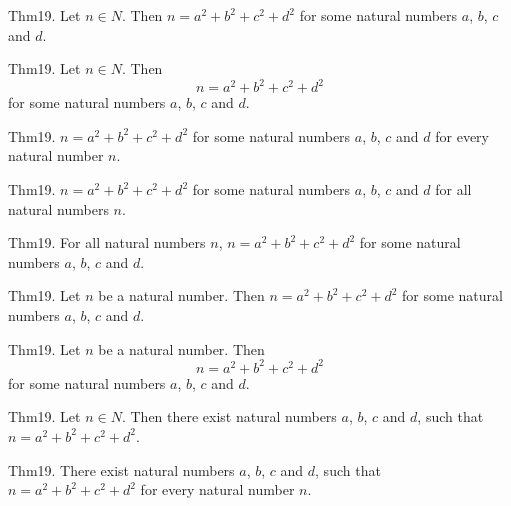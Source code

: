 \documentclass{article}
\begin{document}
Thm19. Let $n \in N$. Then $n = a ^{ 2}+ b ^{ 2}+ c ^{ 2}+ d ^{ 2}$ for some natural numbers $a$, $b$, $c$ and $d$.

Thm19. Let $n \in N$. Then $$n = a ^{ 2}+ b ^{ 2}+ c ^{ 2}+ d ^{ 2}$$ for some natural numbers $a$, $b$, $c$ and $d$.

Thm19. $n = a ^{ 2}+ b ^{ 2}+ c ^{ 2}+ d ^{ 2}$ for some natural numbers $a$, $b$, $c$ and $d$ for every natural number $n$.

Thm19. $n = a ^{ 2}+ b ^{ 2}+ c ^{ 2}+ d ^{ 2}$ for some natural numbers $a$, $b$, $c$ and $d$ for all natural numbers $n$.

Thm19. For all natural numbers $n$, $n = a ^{ 2}+ b ^{ 2}+ c ^{ 2}+ d ^{ 2}$ for some natural numbers $a$, $b$, $c$ and $d$.

Thm19. Let $n$ be a natural number. Then $n = a ^{ 2}+ b ^{ 2}+ c ^{ 2}+ d ^{ 2}$ for some natural numbers $a$, $b$, $c$ and $d$.

Thm19. Let $n$ be a natural number. Then $$n = a ^{ 2}+ b ^{ 2}+ c ^{ 2}+ d ^{ 2}$$ for some natural numbers $a$, $b$, $c$ and $d$.

Thm19. Let $n \in N$. Then there exist natural numbers $a$, $b$, $c$ and $d$, such that $n = a ^{ 2}+ b ^{ 2}+ c ^{ 2}+ d ^{ 2}$.

Thm19. There exist natural numbers $a$, $b$, $c$ and $d$, such that $n = a ^{ 2}+ b ^{ 2}+ c ^{ 2}+ d ^{ 2}$ for every natural number $n$.
\end{document}
